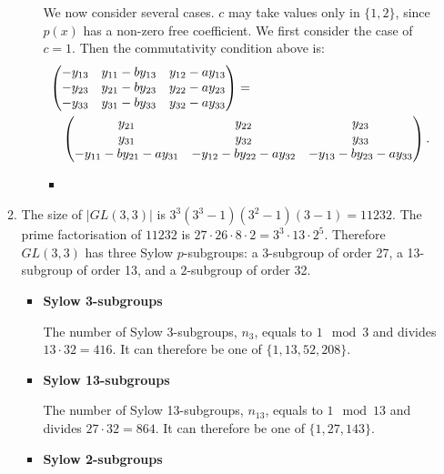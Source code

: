 \documentclass[11pt]{article} \usepackage{amssymb}
\begin{document}
\begin{enumerate}
\begin{enumerate}
\begin{itemize}
        We now consider several cases. $c$ may take values only in $\{1,2\}$,
        since $p(x)$ has a non-zero free coefficient. We first consider the
        case of $c=1$. Then the commutativity condition above is:
        \begin{eqnarray*}
          \lefteqn{
            \begin{pmatrix}
              -y_{13}&y_{11}-by_{13}  &y_{12}-ay_{13} \\ 
              -y_{23}&y_{21}-by_{23}  &y_{22}-ay_{23} \\ 
              -y_{33}&y_{31}-by_{33}  &y_{32}-ay_{33} 
            \end{pmatrix}
            =}
          \\
          &&
          \begin{pmatrix}
            y_{21}&y_{22}  &y_{23} \\ 
            y_{31}&y_{32}  &y_{33} \\ 
            -y_{11}-by_{21}-ay_{31}&-y_{12}-by_{22}-ay_{32}&-y_{13}-by_{23}-ay_{33}
          \end{pmatrix}.
        \end{eqnarray*}
        
        \begin{itemize}
        \item 
        \end{itemize}
      \end{itemize}
    \item
    The size of $|GL(3,3)|$ is $3^3(3^3-1)(3^2-1)(3-1)=11232$. The prime
    factorisation of $11232$ is 
    $27 \cdot 26 \cdot 8 \cdot 2=3^3 \cdot 13 \cdot 2^5$. Therefore $GL(3,3)$ has three Sylow $p$-subgroups:
    a 3-subgroup of order 27, a 13-subgroup of order 13, and a
    $2$-subgroup of order 32. 

    \begin{itemize}
    \item {\bf Sylow 3-subgroups}
      
      The number of Sylow 3-subgroups, $n_3$, equals to $1\mod 3$ and divides
      $13\cdot 32=416$. It can therefore be one of $\{1,13,52,208\}$. 

    \item {\bf Sylow 13-subgroups}
      
      The number of Sylow 13-subgroups, $n_{13}$, equals to $1\mod 13$ and 
      divides $27\cdot 32=864$. It can therefore be one of $\{1,27,143\}$. 

    \item {\bf Sylow 2-subgroups}
      

\end{itemize}
\end{enumerate}
\end{enumerate}
\end{document}
